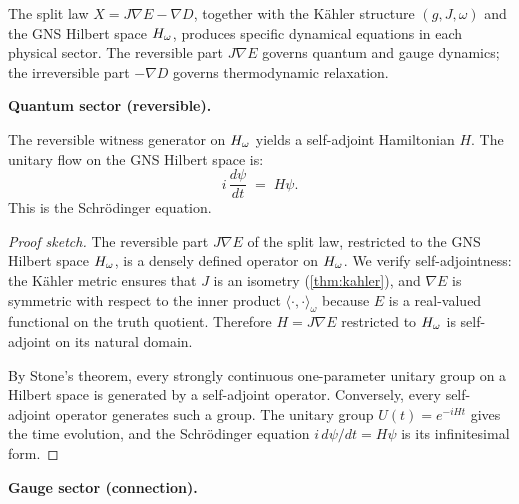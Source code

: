 The split law $X = J\nabla E - \nabla D$, together with the K\"{a}hler
structure $(g, J, \omega)$ and the GNS Hilbert space $H_\omega$, produces
specific dynamical equations in each physical sector.  The reversible part
$J\nabla E$ governs quantum and gauge dynamics; the irreversible part
$-\nabla D$ governs thermodynamic relaxation.

\bigskip
\noindent\textbf{Quantum sector (reversible).}

\begin{theorem}
\label{thm:schrodinger}
The reversible witness generator on $H_\omega$ yields a self-adjoint
Hamiltonian $H$.  The unitary flow on the GNS Hilbert space is:
\[
  i\,\frac{d\psi}{dt} \;=\; H\psi.
\]
This is the Schr\"{o}dinger equation.
\begin{proof}[Proof sketch]
The reversible part $J\nabla E$ of the split law, restricted to the GNS
Hilbert space $H_\omega$, is a densely defined operator on $H_\omega$.  We
verify self-adjointness: the K\"{a}hler metric ensures that $J$ is an
isometry (\cref{thm:kahler}), and $\nabla E$ is symmetric with respect to
the inner product $\langle \cdot, \cdot \rangle_\omega$ because $E$ is a
real-valued functional on the truth quotient.  Therefore $H = J\nabla E$
restricted to $H_\omega$ is self-adjoint on its natural domain.

By Stone's theorem, every strongly continuous one-parameter unitary group
on a Hilbert space is generated by a self-adjoint operator.  Conversely,
every self-adjoint operator generates such a group.  The unitary group
$U(t) = e^{-iHt}$ gives the time evolution, and the Schr\"{o}dinger
equation $i\, d\psi/dt = H\psi$ is its infinitesimal form.

\end{proof}
\end{theorem}

\bigskip
\noindent\textbf{Gauge sector (connection).}

